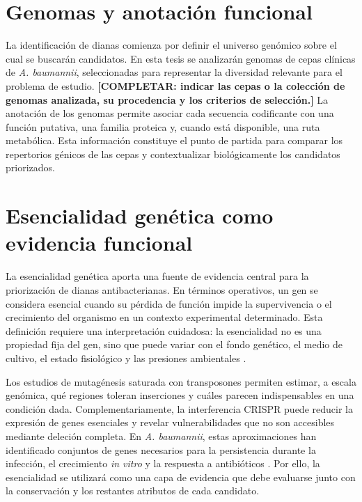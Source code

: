 \section{Genomas y anotación funcional}

La identificación de dianas comienza por definir el universo genómico sobre el cual se buscarán candidatos. En esta tesis se analizarán genomas de cepas clínicas de \textit{A. baumannii}, seleccionadas para representar la diversidad relevante para el problema de estudio. \textbf{[COMPLETAR: indicar las cepas o la colección de genomas analizada, su procedencia y los criterios de selección.]} La anotación de los genomas permite asociar cada secuencia codificante con una función putativa, una familia proteica y, cuando está disponible, una ruta metabólica. Esta información constituye el punto de partida para comparar los repertorios génicos de las cepas y contextualizar biológicamente los candidatos priorizados.

\section{Esencialidad genética como evidencia funcional}

La esencialidad genética aporta una fuente de evidencia central para la priorización de dianas antibacterianas. En términos operativos, un gen se considera esencial cuando su pérdida de función impide la supervivencia o el crecimiento del organismo en un contexto experimental determinado. Esta definición requiere una interpretación cuidadosa: la esencialidad no es una propiedad fija del gen, sino que puede variar con el fondo genético, el medio de cultivo, el estado fisiológico y las presiones ambientales \cite{EsencialidadRancati2018,EsencialidadHogan2022}.

Los estudios de mutagénesis saturada con transposones permiten estimar, a escala genómica, qué regiones toleran inserciones y cuáles parecen indispensables en una condición dada. Complementariamente, la interferencia CRISPR puede reducir la expresión de genes esenciales y revelar vulnerabilidades que no son accesibles mediante deleción completa. En \textit{A. baumannii}, estas aproximaciones han identificado conjuntos de genes necesarios para la persistencia durante la infección, el crecimiento \textit{in vitro} y la respuesta a antibióticos \cite{EsencialidadWang2014,EsencialidadBai2021,EsencialidadWard2023}. Por ello, la esencialidad se utilizará como una capa de evidencia que debe evaluarse junto con la conservación y los restantes atributos de cada candidato.

